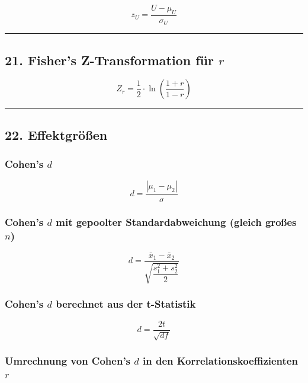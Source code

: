 \documentclass[
]{article}
\begin{document}
\[z_U = \frac{U - \mu_U}{\sigma_U}\]

\begin{center}\rule{0.5\linewidth}{0.5pt}\end{center}

\subsection{\texorpdfstring{21. Fisher's Z-Transformation für
\(r\)}{21. Fisher's Z-Transformation für r}}\label{fishers-z-transformation-fuxfcr-r}

\[Z_r = \frac{1}{2} \cdot \ln\left(\frac{1 + r}{1 - r}\right)\]

\begin{center}\rule{0.5\linewidth}{0.5pt}\end{center}

\subsection{22. Effektgrößen}\label{effektgruxf6uxdfen}

\subsubsection{\texorpdfstring{Cohen's
\(d\)}{Cohen's d}}\label{cohens-d}

\[d = \frac{|\mu_1 - \mu_2|}{\sigma}\]

\subsubsection{\texorpdfstring{Cohen's \(d\) mit gepoolter
Standardabweichung (gleich großes
\(n\))}{Cohen's d mit gepoolter Standardabweichung (gleich großes n)}}\label{cohens-d-mit-gepoolter-standardabweichung-gleich-grouxdfes-n}

\[d = \frac{\bar{x}_1 - \bar{x}_2}{\sqrt{\dfrac{s_1^2 + s_2^2}{2}}}\]

\subsubsection{\texorpdfstring{Cohen's \(d\) berechnet aus der
t-Statistik}{Cohen's d berechnet aus der t-Statistik}}\label{cohens-d-berechnet-aus-der-t-statistik}

\[d = \frac{2t}{\sqrt{df}}\]

\subsubsection{\texorpdfstring{Umrechnung von Cohen's \(d\) in den
Korrelationskoeffizienten
\(r\)}{Umrechnung von Cohen's d in den Korrelationskoeffizienten r}}\label{umrechnung-von-cohens-d-in-den-korrelationskoeffizienten-r}
\end{document}
